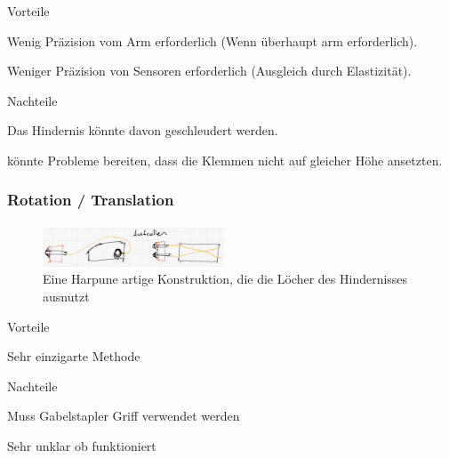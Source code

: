 \begin{minipage}[t]{0.48\textwidth}
    \begin{items}
          \item [Vorteile]
          \item Wenig Präzision vom Arm erforderlich (Wenn überhaupt arm erforderlich).
          \item Weniger Präzision von Sensoren erforderlich (Ausgleich durch Elastizität).
    \end{items}
\end{minipage}
\hfill
\begin{minipage}[t]{0.48\textwidth}
    \begin{items}
          \item [Nachteile]
          \item Das Hindernis könnte davon geschleudert werden.
          \item könnte Probleme bereiten, dass die Klemmen nicht auf gleicher Höhe ansetzten.
    \end{items}
\end{minipage}
\subsubsection{Rotation / Translation}
\paragraph{}
\begin{figure}[h!]
        \centering
        \includegraphics[width=0.48\textwidth]{img/technologierecherche/Rotation/harponne.jpg}
        \caption{Eine Harpune artige Konstruktion, die die Löcher des Hindernisses ausnutzt}
        \label{img:tech_harponne}
\end{figure}
\begin{minipage}[t]{0.48\textwidth}
    \begin{items}
          \item [Vorteile]
          \item Sehr einzigarte Methode
    \end{items}
\end{minipage}
\hfill
\begin{minipage}[t]{0.48\textwidth}
    \begin{items}
          \item [Nachteile]
          \item Muss Gabelstapler Griff verwendet werden
          \item Sehr unklar ob funktioniert
          \item 
          \item 
    \end{items}
\end{minipage}
